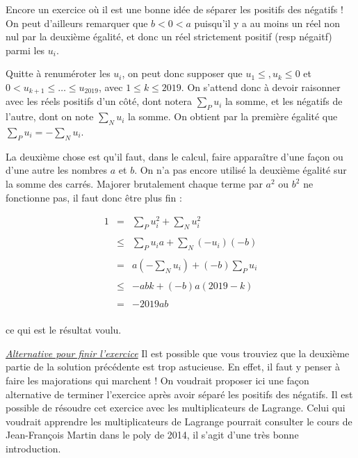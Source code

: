 \begin{sol}
Encore un exercice où il est une bonne idée de séparer les positifs des négatifs ! On peut d'ailleurs remarquer que $b< 0 < a$ puisqu'il y a au moins un réel non nul par la deuxième égalité, et donc un réel strictement positif (resp négaitf) parmi les $u_i$.

Quitte à renuméroter les $u_i$, on peut donc supposer que $u_1 \leqslant , u_k \leqslant 0$ et $0<u_{k+1} \leqslant \ldots \leqslant u_{2019}$, avec $1\leqslant k \leqslant 2019$. On s'attend donc à devoir raisonner avec les réels positifs d'un côté, dont notera $\sum_P u_i$ la somme, et les négatifs de l'autre, dont on note $\sum_N u_i$ la somme. On obtient par la première égalité que $\sum_P u_i = - \sum_N u_i$.

La deuxième chose est qu'il faut, dans le calcul, faire apparaître d'une façon ou d'une autre les nombres $a$ et $b$. On n'a pas encore utilisé la deuxième égalité sur la somme des carrés. Majorer brutalement chaque terme par $a^2$ ou $b^2$ ne fonctionne pas, il faut donc être plus fin : 

\[\begin{array}{lll}
1 &=&\displaystyle \sum_P u_i^2 + \sum_N u_i^2 \\
&&\\
&\leqslant & \displaystyle \sum_P u_i a + \sum_N (-u_i) (-b)\\
&&\\
&=&\displaystyle a(-\sum_N u_i) + (-b) \sum_P u_i \\
&&\\
&\leqslant&\displaystyle -abk + (-b) a(2019-k) \\
&&\\
&=& \displaystyle -2019ab\\ 
\end{array}\]

ce qui est le résultat voulu. 

\underline{\textit{Alternative pour finir l'exercice}}
Il est possible que vous trouviez que la deuxième partie de la solution précédente est trop astucieuse. En effet, il faut y penser à faire les majorations qui marchent ! On voudrait proposer ici une façon alternative de terminer l'exercice après avoir séparé les positifs des négatifs. Il est possible de résoudre cet exercice avec les multiplicateurs de Lagrange. Celui qui voudrait apprendre les multiplicateurs de Lagrange pourrait consulter le cours de Jean-François Martin dans le poly de 2014, il s'agit d'une très bonne introduction. 


\end{sol}
